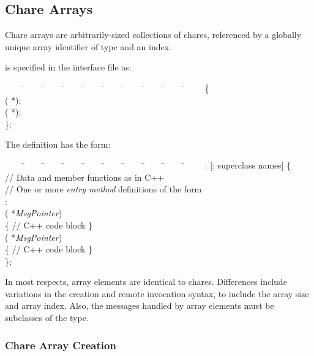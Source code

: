 \subsection{Chare Arrays}

Chare arrays  are arbitrarily-sized collections of chares,
referenced by a globally unique array identifier of type 
 and an index. 

 is specified in the interface file as:

\begin{tabbing}
~~~~ \=~~~~ \=~~~~ \=~~~~ \=~~~~ \=~~~~ \=~~~~ \=~~~~ \=~~~~ \=~~~~ \kill
\>   \{ \\
\> \>  ( *); \\
\> \>  ( *); \\
\> \};
\end{tabbing}

The definition has the form:

\begin{tabbing}
~~~~ \=~~~~ \=~~~~ \=~~~~ \=~~~~ \=~~~~ \=~~~~ \=~~~~ \=~~~~ \=~~~~ \kill
\>   :  [: superclass
names] \{ \\
\> \> // Data and member functions as in C++ \\
\> \> // One or more {\it entry method} 
definitions of the form \\
\> : \\
\> \> ( *{\it MsgPointer}) \\
\> \> \> \{ // C++ code block  \} \\
\> \>  ( *{\it MsgPointer}) \\
\> \> \> \{ // C++ code block  \} \\
\> \};
\end{tabbing}

In most respects, array elements are identical to chares.  Differences
include variations in the creation and remote invocation syntax, to
include the array size and array index.  Also, the messages handled by
array elements must be subclasses of the 
 type.


\subsubsection{Chare Array Creation}


